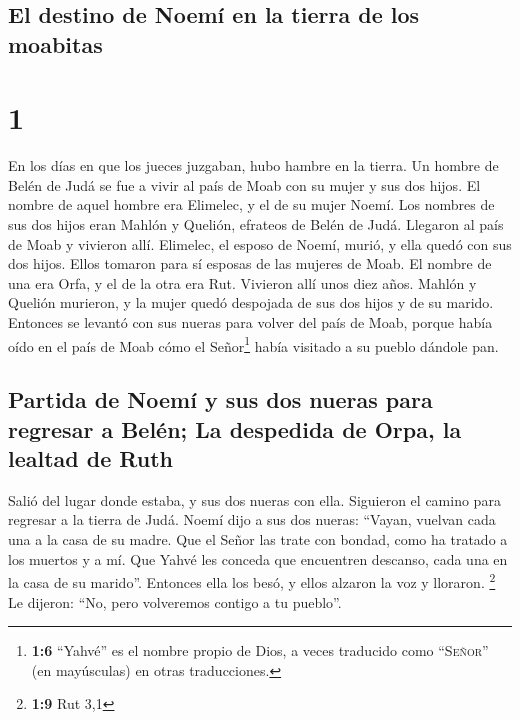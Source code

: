 \hypertarget{el-destino-de-noemuxed-en-la-tierra-de-los-moabitas}{%
\subsection{El destino de Noemí en la tierra de los
moabitas}\label{el-destino-de-noemuxed-en-la-tierra-de-los-moabitas}}

\hypertarget{section}{%
\section{1}\label{section}}

 En los días en que los jueces juzgaban, hubo hambre en la
tierra. Un hombre de Belén de Judá se fue a vivir al país de Moab con su
mujer y sus dos hijos.  El nombre de aquel hombre era
Elimelec, y el de su mujer Noemí. Los nombres de sus dos hijos eran
Mahlón y Quelión, efrateos de Belén de Judá. Llegaron al país de Moab y
vivieron allí.  Elimelec, el esposo de Noemí, murió, y
ella quedó con sus dos hijos.  Ellos tomaron para sí
esposas de las mujeres de Moab. El nombre de una era Orfa, y el de la
otra era Rut. Vivieron allí unos diez años.  Mahlón y
Quelión murieron, y la mujer quedó despojada de sus dos hijos y de su
marido.  Entonces se levantó con sus nueras para volver
del país de Moab, porque había oído en el país de Moab cómo el
Señor\footnote{\textbf{1:6} ``Yahvé'' es el nombre propio de Dios, a
  veces traducido como ``\textsc{Señor}'' (en mayúsculas) en otras
  traducciones.} había visitado a su pueblo dándole pan.

\hypertarget{partida-de-noemuxed-y-sus-dos-nueras-para-regresar-a-beluxe9n-la-despedida-de-orpa-la-lealtad-de-ruth}{%
\subsection{Partida de Noemí y sus dos nueras para regresar a Belén; La
despedida de Orpa, la lealtad de
Ruth}\label{partida-de-noemuxed-y-sus-dos-nueras-para-regresar-a-beluxe9n-la-despedida-de-orpa-la-lealtad-de-ruth}}

 Salió del lugar donde estaba, y sus dos nueras con ella.
Siguieron el camino para regresar a la tierra de Judá. 
Noemí dijo a sus dos nueras: ``Vayan, vuelvan cada una a la casa de su
madre. Que el Señor las trate con bondad, como ha tratado a los muertos
y a mí.  Que Yahvé les conceda que encuentren descanso,
cada una en la casa de su marido''. Entonces ella los besó, y ellos
alzaron la voz y lloraron. \footnote{\textbf{1:9} Rut 3,1}
 Le dijeron: ``No, pero volveremos contigo a tu pueblo''.

